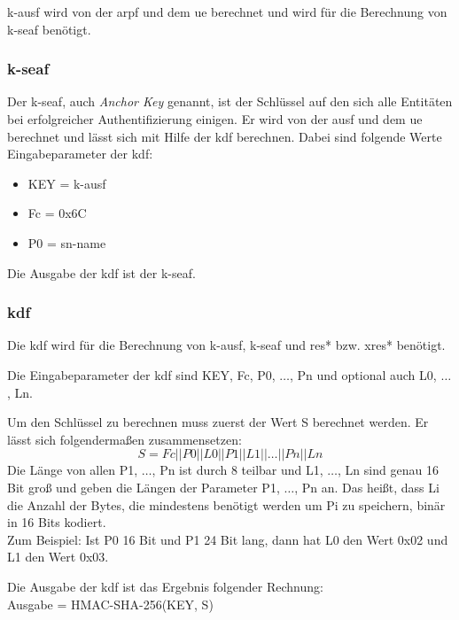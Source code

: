 \gls{k-ausf} wird von der \gls{arpf} und dem \gls{ue} berechnet und wird für die Berechnung von \gls{k-seaf} benötigt.

\subsubsection{\gls{k-seaf}}
Der \gls{k-seaf}, auch \textit{Anchor Key} genannt, ist der Schlüssel auf den sich alle Entitäten bei erfolgreicher Authentifizierung einigen. %
Er wird von der \gls{ausf} und dem \gls{ue} berechnet und lässt sich mit Hilfe der \gls{kdf} berechnen.
Dabei sind folgende Werte Eingabeparameter der \gls{kdf}: %
\begin{itemize}
\item KEY = \gls{k-ausf}
\item Fc = 0x6C
\item P0 = \gls{sn-name}
\end{itemize}
Die Ausgabe der \gls{kdf} ist der \gls{k-seaf}.

\subsubsection{\gls{kdf}}
Die \gls{kdf} wird für die Berechnung von \gls{k-ausf}, \gls{k-seaf} und \gls{res*} bzw. \gls{xres*} benötigt.

Die Eingabeparameter der \gls{kdf} sind KEY, Fc, P0, $ \dots $, Pn und optional auch L0, $ \dots $, Ln.

Um den Schlüssel zu berechnen muss zuerst der Wert S berechnet werden. %
Er l\"asst sich folgendermaßen zusammensetzen: 
\begin{equation*}
S = Fc || P0 || L0 || P1 || L1 || \dots || Pn || Ln 
\end{equation*}
Die Länge von allen P1, $ \dots $, Pn ist durch 8 teilbar und L1, $ \dots $, Ln sind genau 16 Bit groß und geben die Längen der Parameter P1, $ \dots $, Pn an. 
Das heißt, dass Li die Anzahl der Bytes, die mindestens benötigt werden um Pi zu speichern, binär in 16 Bits kodiert. \\
Zum Beispiel: Ist P0 16 Bit und P1 24 Bit lang, dann hat L0 den Wert 0x02 und L1 den Wert 0x03.

Die Ausgabe der \gls{kdf} ist das Ergebnis folgender Rechnung: \\
Ausgabe = HMAC-SHA-256(KEY, S) \\

